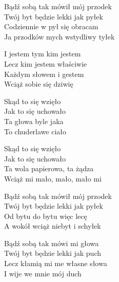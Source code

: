 \begin{text}
    Bądź sobą tak mówił mój przodek\\
    Twój byt będzie lekki jak pyłek\\
    Codziennie w pył się obracam\\
    Ja przodków mych wstydliwy tyłek

    \vin I jestem tym kim jestem\\
    \vin Lecz kim jestem właściwie\\
    \vin Każdym słowem i gestem\\
    \vin Wciąż sobie się dziwię

    \vin Skąd to się wzięło\\
    \vin Jak to się uchowało\\
    \vin Ta głowa byle jaka\\
    \vin To chuderlawe ciało

    \vin Skąd to się wzięło\\
    \vin Jak to się uchowało\\
    \vin Ta wola papierowa, ta żądza\\
    \vin Wciąż mi mało, mało, mało mi

    Bądź sobą tak mówił mój przodek\\
    Twój byt będzie lekki jak pyłek\\
    Od bytu do bytu więc lecę\\
    A wokół wciąż niebyt i schyłek

    Bądź sobą tak mówi mi głowa\\
    Twój byt będzie lekki jak puch\\
    Lecz kłamią mi me własne słowa\\
    I wije we mnie mój duch
\end{text}
\begin{chord}

\end{chord}